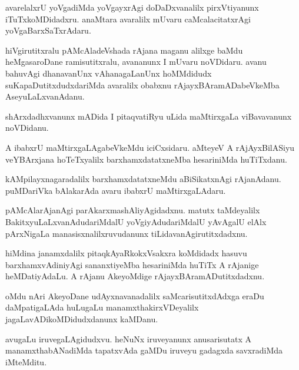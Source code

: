\documentclass{article}
\begin{document}
\begin{mn}
avarelalxrU yoVgadiMda yoVgayxrAgi doDaDxvanalilx pirxVtiyanunx
iTuTxkoMDidadxru. anaMtara avaralilx mUvaru caMcalacitatxrAgi yoVgaBarxSaTxrAdaru.
\end{mn}

\begin{mn}%
hiVgirutitxralu pAMcAladeVshada rAjana maganu alilxge baMdu
heMgasaroDane ramisutitxralu, avananunx I mUvaru noVDidaru. avanu
bahuvAgi dhanavanUnx vAhanagaLanUnx hoMMdidudx suKapaDutitxdudxdariMda
avaralilx obabxnu rAjayxBAramADabeVkeMba AseyuLaLxvanAdanu.
\end{mn}

\begin{mn}%
shArxdadhxvanunx mADida I pitaqvatiRyu uLida maMtirxgaLa viBavavanunx noVDidanu.
\end{mn}

\begin{mn}
A ibabxrU maMtirxgaLAgabeVkeMdu iciCxsidaru. aMteyeV A rAjAyxBilASiyu
veYBArxjana hoTeTxyalilx barxhamxdatatxneMba hesariniMda huTiTxdanu.
\end{mn}

\begin{mn}
kAMpilayxnagaradalilx barxhamxdatatxneMdu aBiSikatxnAgi
rAjanAdanu. puMDariVka bAlakarAda avaru ibabxrU maMtirxgaLAdaru.
\end{mn}

\begin{mn}%
pAMcAlarAjanAgi parAkarxmashAliyAgidadxnu. matutx taMdeyalilx
BakitxyuLaLxvanAdudariMdalU yoVgiyAdudariMdalU yAvAgalU elAlx
pArxNigaLa manasisxnalilxruvudanunx tiLidavanAgirutitxdadxnu.
\end{mn}

\begin{mn}%
hiMdina janamxdalilx pitaqkAyaRkokxVsakxra koMdidadx hasuvu
barxhamxvAdiniyAgi sananxtiyeMba hesariniMda huTiTx A rAjanige
heMDatiyAdaLu. A rAjanu AkeyoMdige rAjayxBAramADutitxdadxnu.
\end{mn}

\begin{mn}%
oMdu nAri AkeyoDane udAyxnavanadalilx saMcarisutitxdAdxga eraDu
daMpatigaLAda huLugaLu manamxthakirxVDeyalilx
jagaLavADikoMDidudxdanunx kaMDanu.
\end{mn}

\begin{mn}
avugaLu iruvegaLAgidudxvu. heNuNx iruveyanunx anusarisutatx A
manamxthabANadiMda tapatxvAda gaMDu iruveyu gadagxda savxradiMda iMteMditu.
\end{mn}
\end{document}
